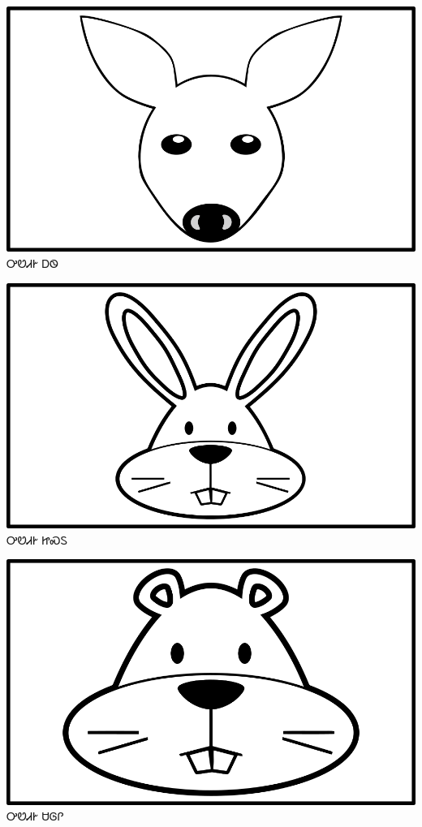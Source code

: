 \documentclass[avery5371]{flashcards}%
\begin{document}
    \begin{flashcard}{
        \includegraphics[width=0.95\columnwidth,height=.51\columnwidth,keepaspectratio]{../artwork/objects-animate/ahwi}
    }
        \Huge ᎤᏬᏗᎨ ᎠᏫ
    \end{flashcard}

    \begin{flashcard}{
        \includegraphics[width=0.95\columnwidth,height=.51\columnwidth,keepaspectratio]{../artwork/objects-animate/jisdu}
    }
        \Huge ᎤᏬᏗᎨ ᏥᏍᏚ
    \end{flashcard}

    \begin{flashcard}{
        \includegraphics[width=0.95\columnwidth,height=.51\columnwidth,keepaspectratio]{../artwork/objects-animate/saloli}
    }
        \Huge ᎤᏬᏗᎨ ᏌᎶᎵ
    \end{flashcard}
\end{document}
